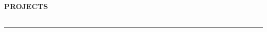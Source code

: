 \begin{center}
\textbf{PROJECTS}
\end{center}

\vspace{\sectionTitleSpacing}

\begin{longtable}{p{}p{}}




\end{longtable}

\vspace{\sectionSeparatorSpacing}
\rule{\textwidth}{}
\vspace{\sectionSeparatorSpacing} 